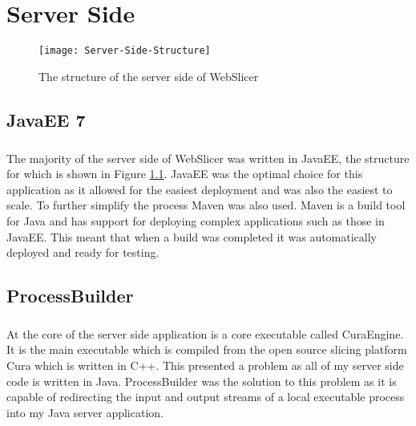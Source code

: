\chapter{Server Side}
\begin{figure}[!ht]
  \centering
  \texttt{[image: Server-Side-Structure]}
  \caption{The structure of the server side of WebSlicer}
  \label{fig:server-side-structure}
\end{figure}

\section{JavaEE 7}
\paragraph{}
The majority of the server side of WebSlicer was written in JavaEE, the structure for which is shown in Figure \ref{fig:server-side-structure}.
JavaEE was the optimal choice for this application as it allowed for the easiest deployment and was also the easiest to scale.
To further simplify the process Maven was also used.
Maven is a build tool for Java and has support for deploying complex applications such as those in JavaEE.
This meant that when a build was completed it was automatically deployed and ready for testing.

\section{ProcessBuilder}
\paragraph{}
At the core of the server side application is a core executable called CuraEngine. 
It is the main executable which is compiled from the open source slicing platform Cura which is written in C++. 
This presented a problem as all of my server side code is written in Java. 
ProcessBuilder was the solution to this problem as it is capable of redirecting the input and output streams of a local executable process into my Java server application.


